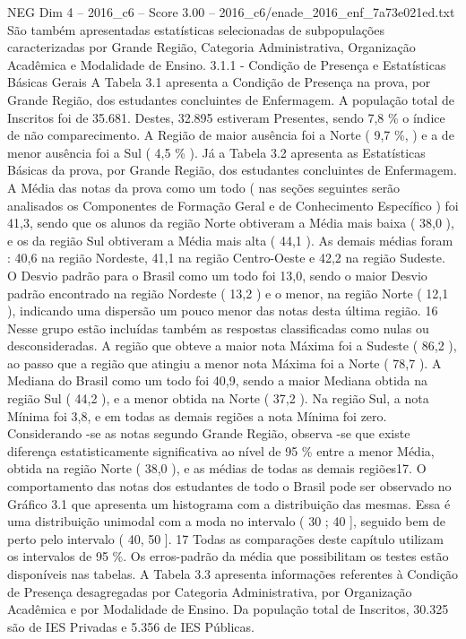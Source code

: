 \begin{textsample}{NEG Dim 4 – 2016\_c6 – Score 3.00 – 2016\_c6/enade\_2016\_enf\_7a73e021ed.txt}
São também apresentadas estatísticas selecionadas de subpopulações caracterizadas por Grande Região, Categoria Administrativa, Organização Acadêmica e Modalidade de Ensino. 3.1.1 - Condição de Presença e Estatísticas Básicas Gerais A Tabela 3.1 apresenta a Condição de Presença na prova, por Grande Região, dos estudantes concluintes de Enfermagem.
A população total de Inscritos foi de 35.681.
Destes, 32.895 estiveram Presentes, sendo 7,8 \% o índice de não comparecimento.
A Região de maior ausência foi a Norte ( 9,7 \%, ) e a de menor ausência foi a Sul ( 4,5 \% ).
Já a Tabela 3.2 apresenta as Estatísticas Básicas da prova, por Grande Região, dos estudantes concluintes de Enfermagem.
A Média das notas da prova como um todo ( nas seções seguintes serão analisados os Componentes de Formação Geral e de Conhecimento Específico ) foi 41,3, sendo que os alunos da região Norte obtiveram a Média mais baixa ( 38,0 ), e os da região Sul obtiveram a Média mais alta ( 44,1 ).
As demais médias foram : 40,6 na região Nordeste, 41,1 na região Centro-Oeste e 42,2 na região Sudeste.
O Desvio padrão para o Brasil como um todo foi 13,0, sendo o maior Desvio padrão encontrado na região Nordeste ( 13,2 ) e o menor, na região Norte ( 12,1 ), indicando uma dispersão um pouco menor das notas desta última região. 16 Nesse grupo estão incluídas também as respostas classificadas como nulas ou desconsideradas.
A região que obteve a maior nota Máxima foi a Sudeste ( 86,2 ), ao passo que a região que atingiu a menor nota Máxima foi a Norte ( 78,7 ).
A Mediana do Brasil como um todo foi 40,9, sendo a maior Mediana obtida na região Sul ( 44,2 ), e a menor obtida na Norte ( 37,2 ).
Na região Sul, a nota Mínima foi 3,8, e em todas as demais regiões a nota Mínima foi zero.
Considerando -se as notas segundo Grande Região, observa -se que existe diferença estatisticamente significativa ao nível de 95 \% entre a menor Média, obtida na região Norte ( 38,0 ), e as médias de todas as demais regiões17.
O comportamento das notas dos estudantes de todo o Brasil pode ser observado no Gráfico 3.1 que apresenta um histograma com a distribuição das mesmas.
Essa é uma distribuição unimodal com a moda no intervalo ( 30 ; 40 ], seguido bem de perto pelo intervalo ( 40, 50 ]. 17 Todas as comparações deste capítulo utilizam os intervalos de 95 \%.
Os erros-padrão da média que possibilitam os testes estão disponíveis nas tabelas.
A Tabela 3.3 apresenta informações referentes à Condição de Presença desagregadas por Categoria Administrativa, por Organização Acadêmica e por Modalidade de Ensino.
Da população total de Inscritos, 30.325 são de IES Privadas e 5.356 de IES Públicas.

\end{textsample}
